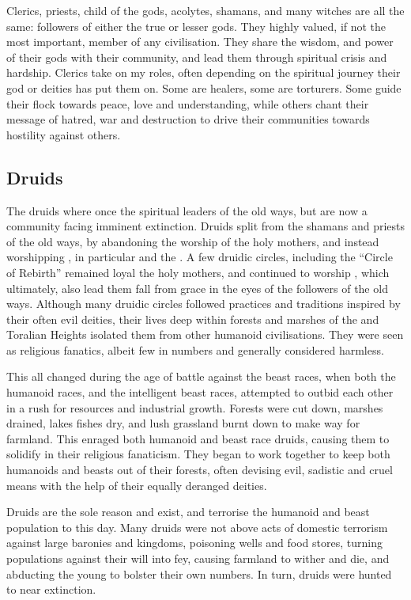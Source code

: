 Clerics, priests, child of the gods, acolytes, shamans, and many witches are
all the same: followers of either the true or lesser gods. They highly valued,
if not the most important, member of any civilisation. They share the wisdom,
and power of their gods with their community, and lead them through spiritual
crisis and hardship. Clerics take on my roles, often depending on the
spiritual journey their god or deities has put them on. Some are healers, some
are torturers. Some guide their flock towards peace, love and understanding,
while others chant their message of hatred, war and destruction to drive their
communities towards hostility against others.

\subsection{Druids}
\label{sec:Druids}

The druids where once the spiritual leaders of the old ways, but are now a
community facing imminent extinction. Druids split from the shamans and priests
of the old ways, by abandoning the worship of the holy mothers, and instead
worshipping , in particular  and the
. A few druidic circles, including the ``Circle of
Rebirth'' remained loyal the holy mothers, and continued to worship
, which ultimately, also lead them fall from grace in the
eyes of the followers of the old ways. Although many druidic circles followed
practices and traditions inspired by their often evil deities, their lives
deep within forests and marshes of the  and Toralian
Heights isolated them from other humanoid civilisations. They were seen as
religious fanatics, albeit few in numbers and generally considered harmless.

This all changed during the age of battle against the beast races, when both
the humanoid races, and the intelligent beast races, attempted to outbid each
other in a rush for resources and industrial growth. Forests were cut down,
marshes drained, lakes fishes dry, and lush grassland burnt down to make way
for farmland. This enraged both humanoid and beast race druids, causing them
to solidify in their religious fanaticism. They began to work together to
keep both humanoids and beasts out of their forests, often devising evil,
sadistic and cruel means with the help of their equally deranged deities.

Druids are the sole reason  and 
exist, and terrorise the humanoid and beast population to this day. Many
druids were not above acts of domestic terrorism against large baronies and
kingdoms, poisoning wells and food stores, turning populations against their
will into fey, causing farmland to wither and die, and abducting the young to
bolster their own numbers. In turn, druids were hunted to near extinction.

